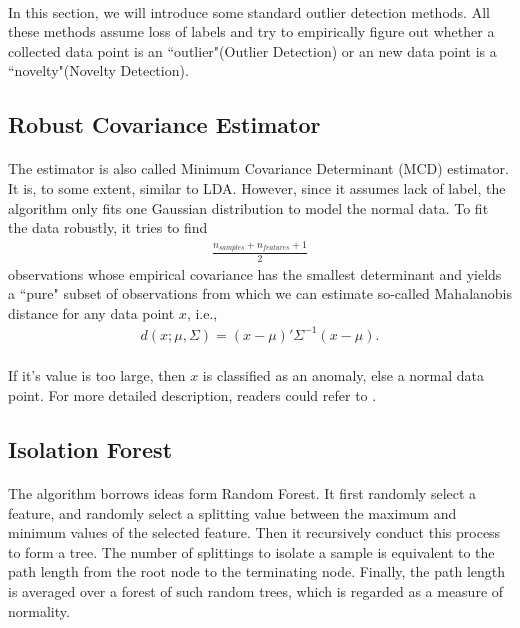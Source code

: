 \documentclass[english]{article}
\newenvironment{eqt}{\begin{equation}\begin{aligned}}{\end{aligned}\end{equation}}
\begin{document}
\paragraph{}
In this section, we will introduce some standard outlier detection methods. All these methods assume loss of labels and try to empirically figure out whether a collected data point is an ``outlier"(Outlier Detection) or an new data point is a ``novelty"(Novelty Detection). 

\subsection{Robust Covariance Estimator}
\paragraph{}
The estimator is also called Minimum Covariance Determinant (MCD) estimator. It is, to some extent, similar to LDA. However, since it assumes lack of label, the algorithm only fits one Gaussian distribution to model the normal data. To fit the data robustly, it tries to find 
\begin{eqt}
\frac{n_{\textit{samples}}+n_{\textit{features}}+1}{2}
\end{eqt}
observations whose empirical covariance has the smallest determinant and yields a ``pure" subset of observations from which we can estimate so-called Mahalanobis distance for any data point $x$, i.e., 
\begin{eqt}
d(x; \mu, \Sigma) = (x-\mu)'\Sigma^{-1}(x-\mu).
\end{eqt}
\paragraph{}
If it's value is too large, then $x$ is classified as an anomaly, else a normal data point. For more detailed description, readers could refer to \cite{robustcov}.


\subsection{Isolation Forest}
\paragraph{}
The algorithm borrows ideas form Random Forest. It first randomly select a feature, and randomly select a splitting value between the maximum and minimum values of the selected feature. Then it recursively conduct this process to form a tree. The number of splittings to isolate a sample is equivalent to the path length from the root node to the terminating node. Finally, the path length is averaged over a forest of such random trees, which is regarded as a measure of normality. 
\end{document}
